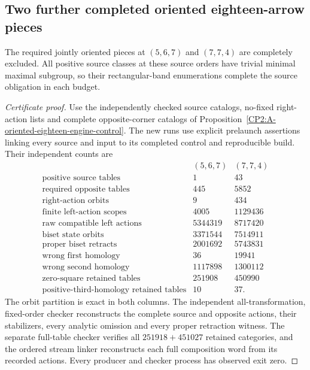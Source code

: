 \subsection{Two further completed oriented eighteen-arrow pieces}

\begin{proposition}
\label{CP2:A-oriented-eighteen-next-two-pieces}
The required jointly oriented pieces at $(5,6,7)$ and
$(7,7,4)$ are completely excluded.  All positive source
classes at these source orders have trivial minimal
maximal subgroup, so their rectangular-band enumerations
complete the source obligation in each budget.
\end{proposition}
\begin{proof}[Certificate proof]
Use the independently checked source catalogs, no-fixed
right-action lists and complete opposite-corner catalogs
of Proposition~\ref{CP2:A-oriented-eighteen-engine-control}.
The new runs use explicit prelaunch assertions linking
every source and input to its completed control and
reproducible build.  Their independent counts are
\[
\begin{array}{c|r|r}
 &(5,6,7)&(7,7,4)\\\hline
\text{positive source tables}&1&43\\
\text{required opposite tables}&445&5852\\
\text{right-action orbits}&9&434\\
\text{finite left-action scopes}&4005&1129436\\
\text{raw compatible left actions}&5344319&8717420\\
\text{biset state orbits}&3371544&7514911\\
\text{proper biset retracts}&2001692&5743831\\
\text{wrong first homology}&36&19941\\
\text{wrong second homology}&1117898&1300112\\
\text{zero-square retained tables}&251908&450990\\
\text{positive-third-homology retained tables}&10&37.
\end{array}
\]
The orbit partition is exact in both columns.  The
independent all-transformation, fixed-order checker
reconstructs the complete source and opposite actions,
their stabilizers, every analytic omission and every
proper retraction witness.  The separate full-table
checker verifies all $251918+451027$ retained categories,
and the ordered stream linker reconstructs each full
composition word from its recorded actions.  Every
producer and checker process has observed exit zero.


\end{proof}
